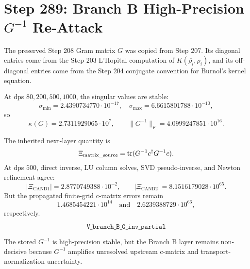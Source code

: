 \section*{Step 289: Branch B High-Precision \(G^{-1}\) Re-Attack}

The preserved Step 208 Gram matrix \(G\) was copied from Step 207.  Its
diagonal entries come from the Step 203 L'Hopital computation of
\(K(\overline{\rho_i},\rho_i)\), and its off-diagonal entries come from the
Step 204 conjugate convention for Burnol's kernel equation.

At dps \(80,200,500,1000\), the singular values are stable:
\[
\sigma_{\min}=2.4390734770\cdot 10^{-17},\quad
\sigma_{\max}=6.6615801788\cdot 10^{-10},
\]
so
\[
\kappa(G)=2.7311929065\cdot 10^7,\qquad
\|G^{-1}\|_F=4.0999247851\cdot 10^{16}.
\]

The inherited next-layer quantity is
\[
\Xi_{\rm matrix\_source}=\operatorname{tr}(G^{-1}c^\dagger G^{-1}c).
\]
At dps \(500\), direct inverse, LU column solves, SVD pseudo-inverse, and
Newton refinement agree:
\[
|\Xi_{\mathrm{CAND1}}|=2.8770749388\cdot 10^{-2},
\qquad
|\Xi_{\mathrm{CAND2}}|=8.1516179028\cdot 10^{65}.
\]
But the propagated finite-grid c-matrix errors remain
\[
1.4685454221\cdot 10^{14}
\quad\text{and}\quad
2.6239388729\cdot 10^{66},
\]
respectively.

\[
\boxed{\texttt{V\_branch\_B\_G\_inv\_partial}}
\]

The stored \(G^{-1}\) is high-precision stable, but the Branch B layer remains
non-decisive because \(G^{-1}\) amplifies unresolved upstream c-matrix and
transport-normalization uncertainty.
